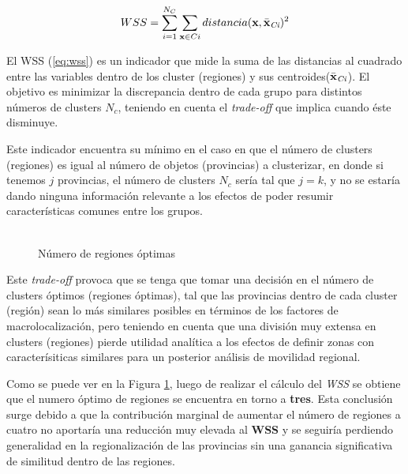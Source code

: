 \documentclass[12pt,a4paper]{article}
\begin{document}
\begin {center}
\begin{equation}\label{eq:wss}
WSS=\sum_{i=1}^{N_{C}} \sum_{\textbf{x}\in Ci} distancia(\textbf{x},\bar{\textbf{x}}_{\tiny{\textit{Ci}}})^{2}
\end{equation}
\end {center}

El WSS (\ref{eq:wss}) es un indicador que mide la suma de las distancias al cuadrado entre las variables dentro de  los cluster (regiones) y sus centroides($\bar{\textbf{x}}_{\tiny{\textit{Ci}}}$). El objetivo es minimizar la discrepancia dentro de cada grupo para distintos números de clusters $N_c$, teniendo en cuenta el \textit{trade-off} que implica cuando éste disminuye. 

Este indicador encuentra su mínimo en el caso en que el número de clusters (regiones) es igual al número de objetos (provincias) a clusterizar, en donde si tenemos $j$ provincias, el número de clusters $N_c$ sería tal que $j=k$, y no se estaría dando ninguna información relevante a los efectos de poder resumir características comunes entre los grupos. 

\begin{figure}[htbp!]
\begin{center}
	\caption{\\Número de regiones óptimas}
 	
	\label{figure:optimas}
\end{center}
\end{figure}

Este \textit{trade-off} provoca que se tenga que tomar una decisión en el número de clusters óptimos (regiones óptimas), tal que las provincias dentro de cada cluster (región) sean lo más similares posibles en términos de los factores de macrolocalización, pero teniendo en cuenta que una división muy extensa en clusters (regiones) pierde utilidad analítica a los efectos de definir zonas con caracterísiticas similares para un posterior análisis de movilidad regional.

Como se puede ver en la Figura \ref{figure:optimas}, luego de realizar el cálculo del \textit{WSS} se obtiene que el numero óptimo de regiones se encuentra en torno a \textbf{tres}. Esta conclusión surge debido a que la contribución marginal de aumentar el número de regiones a cuatro no aportaría una reducción muy elevada al \textbf{WSS} y se seguiría perdiendo generalidad en la regionalización de las provincias sin una ganancia significativa de similitud dentro de las regiones.
\end{document}
